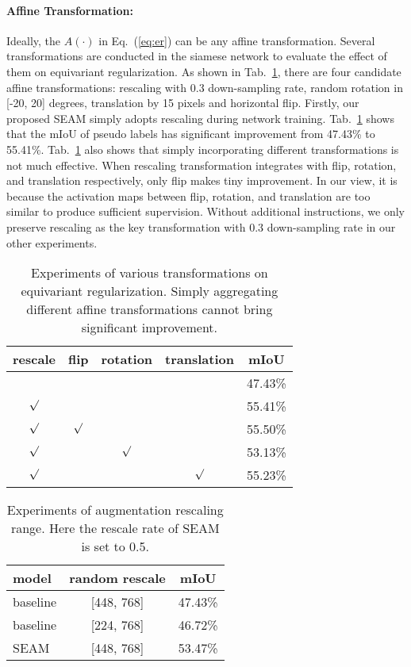 \documentclass[10pt,twocolumn,letterpaper]{article}
\begin{document}
\paragraph{Affine Transformation:}
	Ideally, the $A(\cdot)$ in Eq.~(\ref{eq:er}) can be any affine transformation. Several transformations are conducted in the siamese network to evaluate the effect of them on equivariant regularization. As shown in Tab.~\ref{tab:transformation}, there are four candidate affine transformations: rescaling with 0.3 down-sampling rate, random rotation in [-20, 20] degrees, translation by 15 pixels and horizontal flip. Firstly, our proposed SEAM simply adopts rescaling during network training. Tab.~\ref{tab:transformation} shows that the mIoU of pseudo labels has significant improvement from 47.43\% to 55.41\%. Tab.~\ref{tab:transformation} also shows that simply incorporating different transformations is not much effective. When rescaling transformation integrates with flip, rotation, and translation respectively, only flip makes tiny improvement. In our view, it is because the activation maps between flip, rotation, and translation are too similar to produce sufficient supervision. Without additional instructions, we only preserve rescaling as the key transformation with $0.3$ down-sampling rate in our other experiments.
	\begin{table}[tbp]
		\centering
		\begin{tabular}{ccccc}
			\hline
			rescale & flip & rotation & translation & mIoU\\
			\hline
			& & & & 47.43\%\\
			$\surd$ & & & & 55.41\%\\
			$\surd$ & $\surd$ & & & 55.50\%\\
			$\surd$ & & $\surd$ & & 53.13\%\\
			$\surd$ & & & $\surd$ & 55.23\%\\
			\hline
		\end{tabular}
		\caption{Experiments of various transformations on equivariant regularization. Simply aggregating different affine transformations cannot bring significant improvement.}
		\label{tab:transformation}
\end{table}
	\begin{table}[tbp]
		\centering
		\begin{tabular}{lcc}
			\hline
			model & random rescale & mIoU\\
			\hline
			baseline & [448, 768] & 47.43\%\\
			baseline & [224, 768] & 46.72\%\\
			SEAM & [448, 768] & 53.47\%\\
			\hline
		\end{tabular}
		\caption{Experiments of augmentation rescaling range. Here the rescale rate of SEAM is set to 0.5.}
		\label{tab:range}
\end{table}
\end{document}
